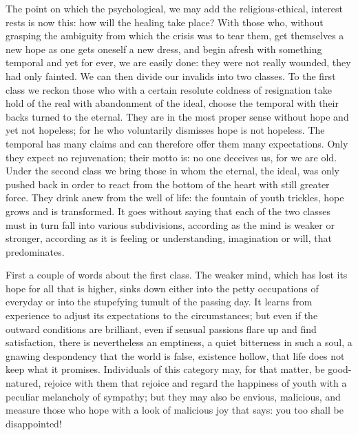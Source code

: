 \documentclass[12pt,a4paper,openany]{book}
\newcommand{\opage}[1]{\marginnote{\footnotesize\textit{[#1]}}}
\begin{document}
The point on which the psychological, we may
add the religious-ethical, interest rests is now this:
how will the healing take place? With those who,
without grasping the ambiguity from which the crisis was to
tear them, get themselves a new hope as one gets oneself
a new dress, and begin afresh with something temporal
and yet for ever, we are easily done: they were not
really wounded, they had only fainted. We can then
divide our invalids into two classes. To the first class
we reckon those who with a certain resolute coldness
of resignation take hold of the real with abandonment
of the ideal, choose the temporal with their backs turned
to the eternal. They are in the most proper sense without
hope and yet not hopeless; for he who voluntarily dismisses
hope is not hopeless. The temporal has
many claims and can therefore offer them many expectations.
Only they expect no rejuvenation; their
motto is: no one deceives us, for we are old.
Under the second class we bring those in whom the
eternal, the ideal, was only pushed back in order to react
from the bottom of the heart with still greater force. They drink
anew from the well of life: the fountain of youth trickles, hope
grows and is transformed. It goes without saying that each
of the two classes must in turn fall into various
\setcounter{footnote}{0}%
\opage{27}subdivisions, according as the mind is weaker or stronger,
according as it is feeling or understanding, imagination
or will, that predominates.

First a couple of words about the first class. The weaker
mind, which has lost its hope for all that is higher,
sinks down either into the petty occupations of everyday or into
the stupefying tumult of the passing day. It learns from experience to
adjust its expectations to the circumstances;
but even if the outward conditions are brilliant, even
if sensual passions flare up and find satisfaction,
there is nevertheless an emptiness, a quiet bitterness in
such a soul, a gnawing despondency that the world is false,
existence hollow, that life does not keep what it promises.
Individuals of this category may, for that matter, be
good-natured, rejoice with them that rejoice and regard the happiness of youth
with a peculiar melancholy of sympathy; but
they may also be envious, malicious, and
measure those who hope with a look of malicious joy that says:
you too shall be disappointed!
\end{document}
